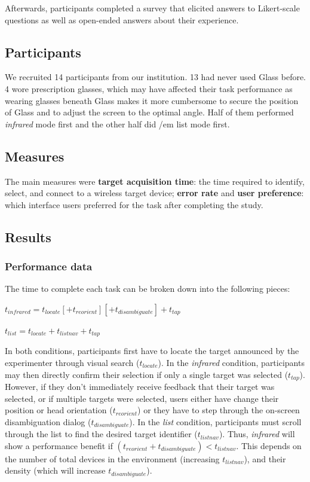 Afterwards, participants completed a survey that elicited answers to Likert-scale questions as well as open-ended answers about their experience.

\subsection{Participants}
We recruited 14 participants from our institution. 13 had never used Glass before. 4 wore prescription glasses, which may have affected their task performance as wearing glasses beneath Glass makes it more cumbersome to secure the position of Glass and to adjust the screen to the optimal angle. Half of them performed {\em infrared} mode first and the other half did {/em list} mode first.

\subsection{Measures}
The main measures were {\bf target acquisition time}: the time required to identify, select, and connect to a wireless target device; {\bf error rate} and {\bf user preference}: which interface users preferred for the task after completing the study.

\subsection{Results}
\subsubsection{Performance data}
The time to complete each task can be broken down into the following pieces:

$t_{infrared}=t_{locate}[+t_{reorient}][+t_{disambiguate}]+t_{tap}$

$t_{list}=t_{locate}+t_{listnav}+t_{tap}$

In both conditions, participants first have to locate the target announced by the experimenter through visual search ($t_{locate}$). In the {\em infrared} condition, participants may then directly confirm their selection if only a single target was selected ($t_{tap}$). However, if they don't immediately receive feedback that their target was selected, or if multiple targets were selected, users either have change their position or head orientation ($t_{reorient}$) or they have to step through the on-screen disambiguation dialog ($t_{disambiguate}$). In the {\em list} condition, participants must scroll through the list to find the desired target identifier ($t_{listnav}$).
Thus, {\em infrared} will show a performance benefit if $(t_{reorient}+t_{disambiguate})<t_{listnav}$. This depends on the number of total devices in the environment (increasing $t_{listnav}$), and their density (which will increase $t_{disambiguate}$). 

